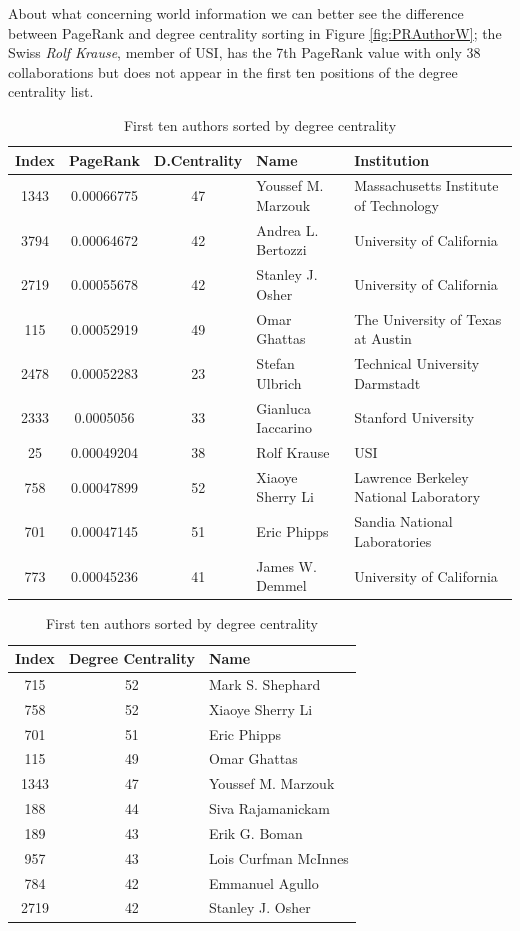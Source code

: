 \documentclass[]{usiinfbachelorproject}
\begin{document}
About what concerning world information we can better see the difference between PageRank and degree centrality sorting in Figure \ref{fig:PRAuthorW}; the Swiss  \textit{Rolf Krause}, member of USI, has the 7th PageRank value with only 38 collaborations but does not appear in the first ten positions of the degree centrality list.

\begin{table}[h!]
\begin{minipage}[b]{.55\linewidth}
\tiny
\begin{tabular*}{\textwidth}{c c c l l}
\textbf{Index} & \textbf{PageRank} & \textbf{D.Centrality} & \textbf{Name} & \textbf{Institution}\\
\hline
1343 & 0.00066775 & 47 & Youssef M. Marzouk & Massachusetts Institute of Technology \\
3794 & 0.00064672 & 42 & Andrea L. Bertozzi & University of California \\
2719 & 0.00055678 & 42 & Stanley J. Osher & University of California \\
115 & 0.00052919 & 49 & Omar Ghattas & The University of Texas at Austin \\
2478 & 0.00052283 & 23 & Stefan Ulbrich & Technical University Darmstadt \\
2333 & 0.0005056 & 33 & Gianluca Iaccarino & Stanford University \\
25 & 0.00049204 & 38 & Rolf Krause & USI \\
758 & 0.00047899 & 52 & Xiaoye Sherry Li & Lawrence Berkeley National Laboratory \\
701 & 0.00047145 & 51 & Eric Phipps & Sandia National Laboratories \\
773 & 0.00045236 & 41 & James W. Demmel& University of California
\end{tabular*}
\label{table:PR}
\caption{First ten authors \\ sorted by PageRank}
\end{minipage}
\begin{minipage}[b]{.4\linewidth}
\tiny
\raggedleft
\begin{tabular}{c c l}
\textbf{Index} & \textbf{Degree Centrality} & \textbf{Name} \\
\hline
715& 52 & Mark S. Shephard \\
758 & 52 & Xiaoye Sherry Li \\
701 & 51 & Eric Phipps\\
115 &49 & Omar Ghattas \\
1343 & 47 & Youssef M. Marzouk\\
188 & 44 & Siva Rajamanickam\\
189 & 43 & Erik G. Boman\\
957 & 43 & Lois Curfman McInnes\\
784 & 42 & Emmanuel Agullo \\
2719 & 42 & Stanley J. Osher
\end{tabular}
\label{table:DC  }
\caption{First ten authors sorted by degree centrality}
\end{minipage}
\end{table}
\end{document}
